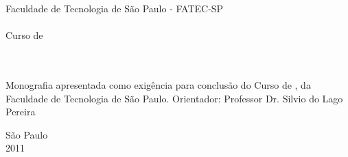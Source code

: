 \thispagestyle{empty}

\begin{center}
Faculdade de Tecnologia de São Paulo - FATEC-SP \\
\DTI \\
Curso de \PD \\
\vspace{2.5cm}
\TITLE \\
\vspace{2.5cm}
\large \BBC \\
\vspace{3cm}
\hspace{7cm} \begin{minipage}{0.5\textwidth}
Monografia apresentada como exigência para conclusão do Curso de \PD, da
Faculdade de Tecnologia de São Paulo. Orientador: Professor Dr. Silvio do
Lago Pereira
\end{minipage}
\vspace{4cm}

\large São Paulo \\ 2011
\end{center}
